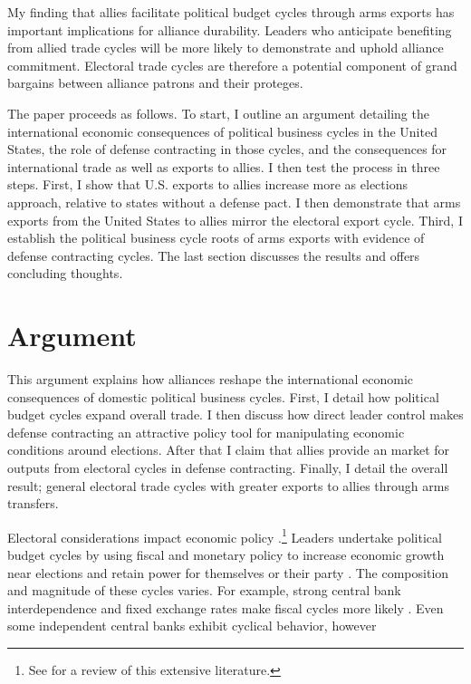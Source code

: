 \documentclass[12pt]{article}
\begin{document}
My finding that allies facilitate political budget cycles through arms exports has important implications for alliance durability. 
Leaders who anticipate benefiting from allied trade cycles will be more likely to demonstrate and uphold alliance commitment. 
Electoral trade cycles are therefore a potential component of grand bargains between alliance patrons and their proteges. 


The paper proceeds as follows. 
To start, I outline an argument detailing the international economic consequences of political business cycles in the United States, the role of defense contracting in those cycles, and the consequences for international trade as well as exports to allies.
I then test the process in three steps. 
First, I show that U.S. exports to allies increase more as elections approach, relative to states without a defense pact. 
I then demonstrate that arms exports from the United States to allies mirror the electoral export cycle.
Third, I establish the political business cycle roots of arms exports with evidence of defense contracting cycles.
The last section discusses the results and offers concluding thoughts.


\section{Argument}


This argument explains how alliances reshape the international economic consequences of domestic political business cycles. 
First, I detail how political budget cycles expand overall trade.
I then discuss how direct leader control makes defense contracting an attractive policy tool for manipulating economic conditions around elections. 
After that I claim that allies provide an market for outputs from electoral cycles in defense contracting. 
Finally, I detail the overall result; general electoral trade cycles with greater exports to allies through arms transfers. 


Electoral considerations impact economic policy \citep{Nordhaus1975}.\footnote{See \citet{Dubois2016} for a review of this extensive literature.} 
Leaders undertake political budget cycles by using fiscal and monetary policy to increase economic growth near elections and retain power for themselves or their party \citep{Tufte1978, Rogoff1987}. 
The composition and magnitude of these cycles varies. 
For example, strong central bank interdependence and fixed exchange rates make fiscal cycles more likely \citep{ClarkHallerberg2000}. 
Even some independent central banks exhibit cyclical behavior, however \citep[pg. 247]{Dubois2016}
\end{document}
